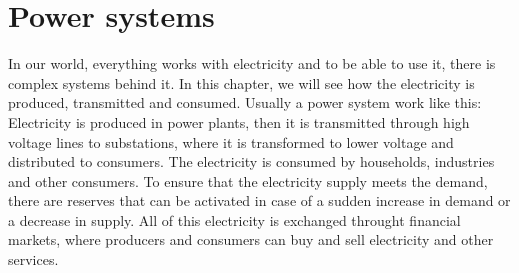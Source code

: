 \documentclass[12pt, openany]{report}
\theoremstyle{definition}
\begin{document}
\chapter{Power systems}
In our world, everything works with electricity and to be able to use it, there is complex systems behind it. In this chapter, we will see how the electricity is produced, transmitted and consumed. Usually a power system work like this: Electricity is produced in power plants, then it is transmitted through high voltage lines to substations, where it is transformed to lower voltage and distributed to consumers. The electricity is consumed by households, industries and other consumers. To ensure that the electricity supply meets the demand, there are reserves that can be activated in case of a sudden increase in demand or a decrease in supply. All of this electricity is exchanged throught financial markets, where producers and consumers can buy and sell electricity and other services. 
\end{document}
